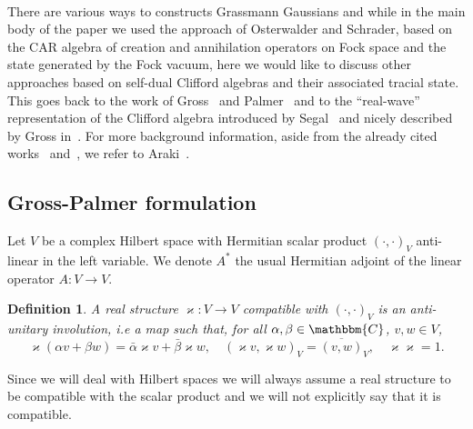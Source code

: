 \documentclass[11pt]{article}
\newcommand{\cdummy}{\cdot}
\newtheorem{definition}{Definition}
\begin{document}
\

There are various ways to constructs Grassmann Gaussians and while in the
main body of the paper we used the approach of Osterwalder and Schrader, based
on the CAR algebra of creation and annihilation operators on Fock space and
the state generated by the Fock vacuum, here we would like to discuss other
approaches based on self-dual Clifford algebras and their associated tracial
state. This goes back to the work of Gross~{\cite{Gross_Euclidean_1976}} and
Palmer~{\cite{palmer_euclidean_1980}} and to the ``real-wave'' representation
of the Clifford algebra introduced by
Segal~{\cite{segal_tensor_1956,Segalbook}} and nicely described by Gross
in~{\cite{gross_existence_1972}}. For more background information, aside from
the already cited works~{\cite{Gross_Euclidean_1976}}
and~{\cite{palmer_euclidean_1980}}, we refer to
Araki~{\cite{araki_representations_1964,araki_diagonalization_1968,araki_quasifree_1970}}.

\subsection{Gross-Palmer formulation}

Let $V$ be a complex Hilbert space with Hermitian scalar product $(\cdot,
\cdot)_V$ anti-linear in the left variable. We denote $A^{\ast}$ the usual
Hermitian adjoint of the linear operator $A : V \rightarrow V$.

\begin{definition}
  \label{GPdef:real-str}A real structure $\varkappa : V \rightarrow V$
  compatible with $(\cdummy, \cdummy)_V$ is an anti-unitary involution, i.e a
  map such that, for all $\alpha, \beta \in \mathbbm{C}$, $v, w \in V$,
  \[ \varkappa (\alpha v + \beta w) = \bar{\alpha} \varkappa v + \bar{\beta}
     \varkappa w, \quad (\varkappa v, \varkappa w)_V = \overline{(v, w)}_V,
     \quad \varkappa \varkappa = 1. \]
\end{definition}

\begin{remark*}
  Since we will deal with Hilbert spaces we will always assume a real
  structure to be compatible with the scalar product and we will not
  explicitly say that it is compatible. 
\end{remark*}
\end{document}
